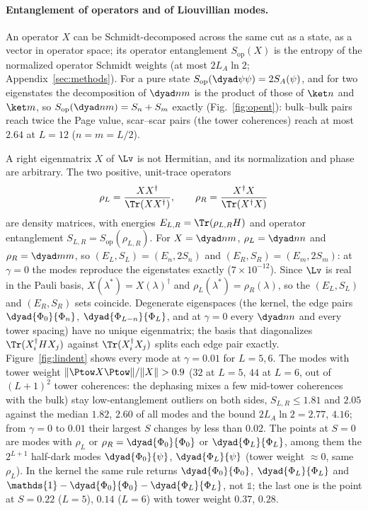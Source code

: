 \paragraph{Entanglement of operators and of Liouvillian modes.} An operator $X$ can be Schmidt-decomposed across the same cut as a state, as a vector in operator space; its operator entanglement $S_{\mathrm{op}}(X)$ is the entropy of the normalized operator Schmidt weights (at most $2L_A\ln 2$; Appendix~\ref{sec:methods}). For a pure state $S_{\mathrm{op}}(\dyad\psi\psi) = 2S_A(\psi)$, and for two eigenstates the decomposition of $\dyad nm$ is the product of those of $\ket n$ and $\ket m$, so $S_{\mathrm{op}}(\dyad nm) = S_n + S_m$ exactly (Fig.~\ref{fig:opent}): bulk--bulk pairs reach twice the Page value, scar--scar pairs (the tower coherences) reach at most $2.64$ at $L = 12$ ($n = m = L/2$).

A right eigenmatrix $X$ of $\Lv$ is not Hermitian, and its normalization and phase are arbitrary. The two positive, unit-trace operators
\begin{equation}
\rho_L = \frac{XX^\dagger}{\Tr(XX^\dagger)}, \qquad \rho_R = \frac{X^\dagger X}{\Tr(X^\dagger X)}
\end{equation}
are density matrices, with energies $E_{L,R} = \Tr(\rho_{L,R}H)$ and operator entanglement $S_{L,R} = S_{\mathrm{op}}(\rho_{L,R})$. For $X = \dyad nm$, $\rho_L = \dyad nn$ and $\rho_R = \dyad mm$, so $(E_L, S_L) = (E_n, 2S_n)$ and $(E_R, S_R) = (E_m, 2S_m)$: at $\gamma = 0$ the modes reproduce the eigenstates exactly ($7\times10^{-12}$). Since $\Lv$ is real in the Pauli basis, $X(\lambda^*) = X(\lambda)^\dagger$ and $\rho_L(\lambda^*) = \rho_R(\lambda)$, so the $(E_L, S_L)$ and $(E_R, S_R)$ sets coincide. Degenerate eigenspaces (the kernel, the edge pairs $\dyad{\Phi_0}{\Phi_n}$, $\dyad{\Phi_{L-n}}{\Phi_L}$, and at $\gamma = 0$ every $\dyad nn$ and every tower spacing) have no unique eigenmatrix; the basis that diagonalizes $\Tr(X_i^\dagger HX_j)$ against $\Tr(X_i^\dagger X_j)$ splits each edge pair exactly. Figure~\ref{fig:lindent} shows every mode at $\gamma = 0.01$ for $L = 5, 6$. The modes with tower weight $\lVert\Ptow X\Ptow\rVert/\lVert X\rVert > 0.9$ ($32$ at $L = 5$, $44$ at $L = 6$, out of $(L+1)^2$ tower coherences: the dephasing mixes a few mid-tower coherences with the bulk) stay low-entanglement outliers on both sides, $S_{L,R} \le 1.81$ and $2.05$ against the median $1.82$, $2.60$ of all modes and the bound $2L_A\ln 2 = 2.77$, $4.16$; from $\gamma = 0$ to $0.01$ their largest $S$ changes by less than $0.02$. The points at $S = 0$ are modes with $\rho_L$ or $\rho_R = \dyad{\Phi_0}{\Phi_0}$ or $\dyad{\Phi_L}{\Phi_L}$, among them the $2^{L+1}$ half-dark modes $\dyad{\Phi_0}{\psi}$, $\dyad{\Phi_L}{\psi}$ (tower weight $\approx 0$, same $\rho_L$). In the kernel the same rule returns $\dyad{\Phi_0}{\Phi_0}$, $\dyad{\Phi_L}{\Phi_L}$ and $\mathds{1} - \dyad{\Phi_0}{\Phi_0} - \dyad{\Phi_L}{\Phi_L}$, not $\mathds{1}$; the last one is the point at $S = 0.22$ ($L = 5$), $0.14$ ($L = 6$) with tower weight $0.37$, $0.28$.

